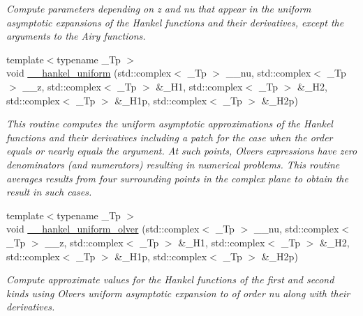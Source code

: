 \begin{DoxyCompactItemize}
\begin{DoxyCompactList}\small\item\em Compute parameters depending on z and nu that appear in the uniform asymptotic expansions of the Hankel functions and their derivatives, except the arguments to the Airy functions. \end{DoxyCompactList}\item 
{\footnotesize template$<$typename \+\_\+\+Tp $>$ }\\void \hyperlink{namespacestd_1_1____detail_aa8e4a43b14fa416b1aa40b80293b44c8}{\+\_\+\+\_\+hankel\+\_\+uniform} (std\+::complex$<$ \+\_\+\+Tp $>$ \+\_\+\+\_\+nu, std\+::complex$<$ \+\_\+\+Tp $>$ \+\_\+\+\_\+z, std\+::complex$<$ \+\_\+\+Tp $>$ \&\+\_\+\+H1, std\+::complex$<$ \+\_\+\+Tp $>$ \&\+\_\+\+H2, std\+::complex$<$ \+\_\+\+Tp $>$ \&\+\_\+\+H1p, std\+::complex$<$ \+\_\+\+Tp $>$ \&\+\_\+\+H2p)
\begin{DoxyCompactList}\small\item\em This routine computes the uniform asymptotic approximations of the Hankel functions and their derivatives including a patch for the case when the order equals or nearly equals the argument. At such points, Olver\textquotesingle{}s expressions have zero denominators (and numerators) resulting in numerical problems. This routine averages results from four surrounding points in the complex plane to obtain the result in such cases. \end{DoxyCompactList}\item 
{\footnotesize template$<$typename \+\_\+\+Tp $>$ }\\void \hyperlink{namespacestd_1_1____detail_a50641f445329898a247143de5a52629f}{\+\_\+\+\_\+hankel\+\_\+uniform\+\_\+olver} (std\+::complex$<$ \+\_\+\+Tp $>$ \+\_\+\+\_\+nu, std\+::complex$<$ \+\_\+\+Tp $>$ \+\_\+\+\_\+z, std\+::complex$<$ \+\_\+\+Tp $>$ \&\+\_\+\+H1, std\+::complex$<$ \+\_\+\+Tp $>$ \&\+\_\+\+H2, std\+::complex$<$ \+\_\+\+Tp $>$ \&\+\_\+\+H1p, std\+::complex$<$ \+\_\+\+Tp $>$ \&\+\_\+\+H2p)
\begin{DoxyCompactList}\small\item\em Compute approximate values for the Hankel functions of the first and second kinds using Olver\textquotesingle{}s uniform asymptotic expansion to of order {\ttfamily nu} along with their derivatives. \end{DoxyCompactList}\item 

\end{DoxyCompactItemize}
